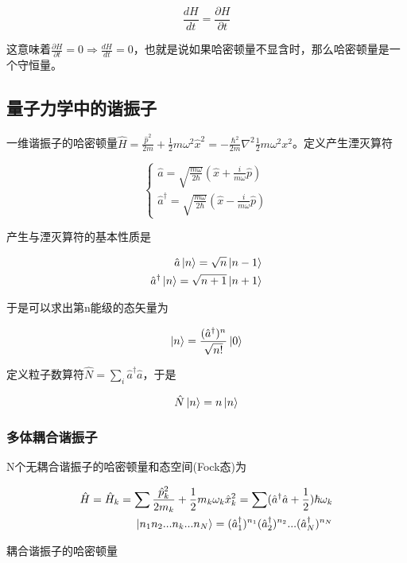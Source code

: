 \begin{equation}
    \frac{d H}{dt}=\frac{\partial H}{\partial t}
\end{equation}

这意味着$\frac{\partial H}{\partial t}=0\Rightarrow\frac{dH}{dt}=0$，也就是说如果哈密顿量不显含时，那么哈密顿量是一个守恒量。



\subsection{量子力学中的谐振子}

一维谐振子的哈密顿量$\hat{H}=\frac{\hat{p}^2}{2m}+\frac{1}{2}m\omega^2\hat{x}^2=-\frac{\hbar^2}{2m}\nabla^2\frac{1}{2}m\omega^2x^2$。定义产生湮灭算符

\begin{equation}
    \left\{
        \begin{array}{lr}
            \hat{a}=\sqrt{\frac{m\omega}{2\hbar}}(\hat{x}+\frac{i}{m\omega}\hat{p})   \\
            \hat{a}^\dagger=\sqrt{\frac{m\omega}{2\hbar}}(\hat{x}-\frac{i}{m\omega}\hat{p})
        \end{array}
    \right.
\end{equation}

产生与湮灭算符的基本性质是

\begin{equation}
    \begin{split}
        \hat{a}\ket{n}=\sqrt{n}\ket{n-1} \\
        \hat{a}^\dagger\ket{n}=\sqrt{n+1}\ket{n+1}
    \end{split}
\end{equation}

于是可以求出第n能级的态矢量为

\begin{equation}
    \ket{n}=\frac{(\hat{a}^\dagger)^n}{\sqrt{n!}}\ket{0}
\end{equation}

定义粒子数算符$\hat{N}=\sum_{i}\hat{a}^\dagger\hat{a}$，于是

\begin{equation}
    \hat{N}\ket{n}=n\ket{n}
\end{equation}

\subsubsection{多体耦合谐振子}

N个无耦合谐振子的哈密顿量和态空间(Fock态)为

\begin{equation}
    \begin{split}
        \hat{H} = \hat{H}_k = \sum\frac{\hat{p}^2_k}{2m_k}+\frac{1}{2}m_k\omega_k\hat{x}_k^2 = \sum(\hat{a}^\dagger\hat{a}+\frac{1}{2})\hbar\omega_k \\
        \ket{n_1n_2...n_k...n_N}=(\hat{a}_1^\dagger)^{n_1}(\hat{a}_2^\dagger)^{n_2}...(\hat{a}_N^\dagger)^{n_N}
    \end{split}
\end{equation}

耦合谐振子的哈密顿量